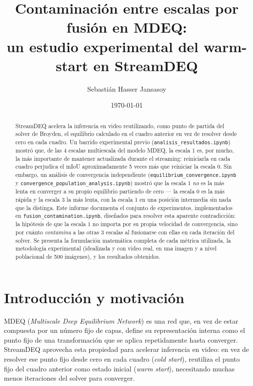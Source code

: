 \documentclass[11pt,a4paper]{article}
\title{Contaminación entre escalas por fusión en MDEQ:\\
un estudio experimental del warm-start en StreamDEQ}
\author{Sebastián Hasser Jansasoy}
\date{\today}
\newcommand{\code}[1]{\texttt{#1}}
\begin{document}
\maketitle

\begin{abstract}
\noindent
StreamDEQ acelera la inferencia en video reutilizando, como punto de partida del solver de
Broyden, el equilibrio calculado en el cuadro anterior en vez de resolver desde cero en cada
cuadro. Un barrido experimental previo (\code{analisis\_resultados.ipynb}) mostró que, de las 4
escalas multiescala del modelo MDEQ, la escala 1 es, por mucho, la más importante de mantener
actualizada durante el streaming: reiniciarla en cada cuadro perjudica el mIoU
aproximadamente 5 veces más que reiniciar la escala 0. Sin embargo, un análisis de convergencia
independiente (\code{equilibrium\_convergence.ipynb} y \code{convergence\_population\_analysis.ipynb})
mostró que la escala 1 \emph{no} es la más lenta en converger a su propio equilibrio partiendo de
cero --- la escala 0 es la más rápida y la escala 3 la más lenta, con la escala 1 en una posición
intermedia sin nada que la distinga. Este informe documenta el conjunto de experimentos,
implementados en \code{fusion\_contamination.ipynb}, diseñados para resolver esta aparente
contradicción: la hipótesis de que la escala 1 no importa por su propia velocidad de convergencia,
sino por cuánto \emph{contamina} a las otras 3 escalas al fusionarse con ellas en cada iteración
del solver. Se presenta la formulación matemática completa de cada métrica utilizada, la
metodología experimental (idealizada y con video real, en una imagen y a nivel poblacional de 500
imágenes), y los resultados obtenidos.
\end{abstract}

\tableofcontents

\section{Introducción y motivación}

MDEQ (\emph{Multiscale Deep Equilibrium Network}) es una red que, en vez de estar compuesta por un
número fijo de capas, define su representación interna como el punto fijo de una transformación
que se aplica repetidamente hasta converger. StreamDEQ aprovecha esta propiedad para acelerar
inferencia en video: en vez de resolver ese punto fijo desde cero en cada cuadro (\emph{cold
start}), reutiliza el punto fijo del cuadro anterior como estado inicial (\emph{warm start}),
necesitando muchas menos iteraciones del solver para converger.
\end{document}
